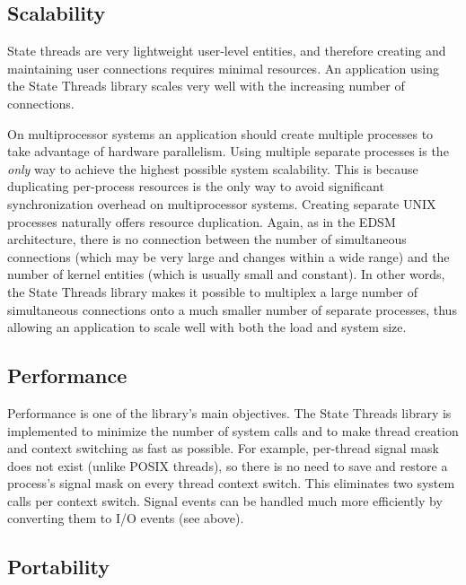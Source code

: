 \documentclass[a4paper,12pt,notitlepage,twoside,openright]{article}
\begin{document}
\hypertarget{scalability}{%
\subsection{Scalability}\label{scalability}}

State threads are very lightweight user-level entities, and therefore
creating and maintaining user connections requires minimal resources. An
application using the State Threads library scales very well with the
increasing number of connections.

On multiprocessor systems an application should create multiple
processes to take advantage of hardware parallelism. Using multiple
separate processes is the \emph{only} way to achieve the highest
possible system scalability. This is because duplicating per-process
resources is the only way to avoid significant synchronization overhead
on multiprocessor systems. Creating separate UNIX processes naturally
offers resource duplication. Again, as in the EDSM architecture, there
is no connection between the number of simultaneous connections (which
may be very large and changes within a wide range) and the number of
kernel entities (which is usually small and constant). In other words,
the State Threads library makes it possible to multiplex a large number
of simultaneous connections onto a much smaller number of separate
processes, thus allowing an application to scale well with both the load
and system size.

\hypertarget{performance}{%
\subsection{Performance}\label{performance}}

Performance is one of the library's main objectives. The State Threads
library is implemented to minimize the number of system calls and to
make thread creation and context switching as fast as possible. For
example, per-thread signal mask does not exist (unlike POSIX threads),
so there is no need to save and restore a process's signal mask on every
thread context switch. This eliminates two system calls per context
switch. Signal events can be handled much more efficiently by converting
them to I/O events (see above).

\hypertarget{portability}{%
\subsection{Portability}\label{portability}}
\end{document}
